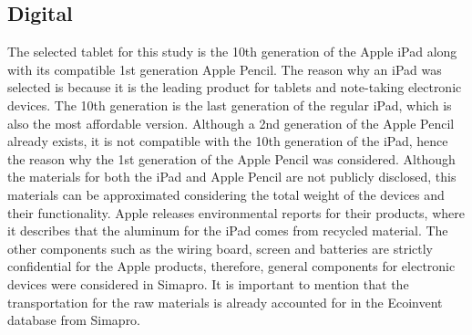 \subsection{Digital}\label{subsec:digital_scenario}
The selected tablet for this study is the 10th generation of the Apple iPad along with its compatible 1st generation Apple Pencil. The reason why an iPad was selected is because it is the leading product for tablets and note-taking electronic devices. The 10th generation is the last generation of the regular iPad, which is also the most affordable version. Although a 2nd generation of the Apple Pencil already exists, it is not compatible with the 10th generation of the iPad, hence the reason why the 1st generation of the Apple Pencil was considered. Although the materials for both the iPad and Apple Pencil are not publicly disclosed, this materials can be approximated considering the total weight of the devices and their functionality. Apple releases environmental reports for their products, where it describes that the aluminum for the iPad comes from recycled material. The other components such as the wiring board, screen and batteries are strictly confidential for the Apple products, therefore, general components for electronic devices were considered in Simapro. It is important to mention that the transportation for the raw materials is already accounted for in the Ecoinvent database from Simapro.
